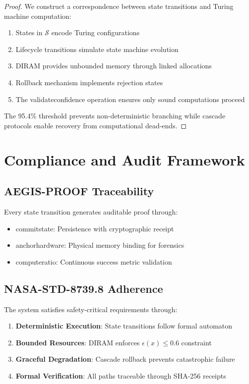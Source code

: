 \documentclass[11pt,conference]{IEEEtran}
\theoremstyle{definition}
\newcommand{\states}{\mathcal{S}}
\begin{document}
\begin{proof}
We construct a correspondence between state transitions and Turing machine computation:
\begin{enumerate}
    \item States in $\states$ encode Turing configurations
    \item Lifecycle transitions simulate state machine evolution
    \item DIRAM provides unbounded memory through linked allocations
    \item Rollback mechanism implements rejection states
    \item The \gls{validateconfidence} operation ensures only sound computations proceed
\end{enumerate}
The 95.4\% threshold prevents non-deterministic branching while cascade protocols enable recovery from computational dead-ends.
\end{proof}

\section{Compliance and Audit Framework}

\subsection{AEGIS-PROOF Traceability}

Every state transition generates auditable proof through:
\begin{itemize}
    \item \gls{commitstate}: Persistence with cryptographic receipt
    \item \gls{anchorhardware}: Physical memory binding for forensics
    \item \gls{computeratio}: Continuous success metric validation
\end{itemize}

\subsection{NASA-STD-8739.8 Adherence}

The system satisfies safety-critical requirements through:
\begin{enumerate}
    \item \textbf{Deterministic Execution}: State transitions follow formal automaton
    \item \textbf{Bounded Resources}: DIRAM enforces $\epsilon(x) \leq 0.6$ constraint
    \item \textbf{Graceful Degradation}: Cascade rollback prevents catastrophic failure
    \item \textbf{Formal Verification}: All paths traceable through SHA-256 receipts
\end{enumerate}
\end{document}
